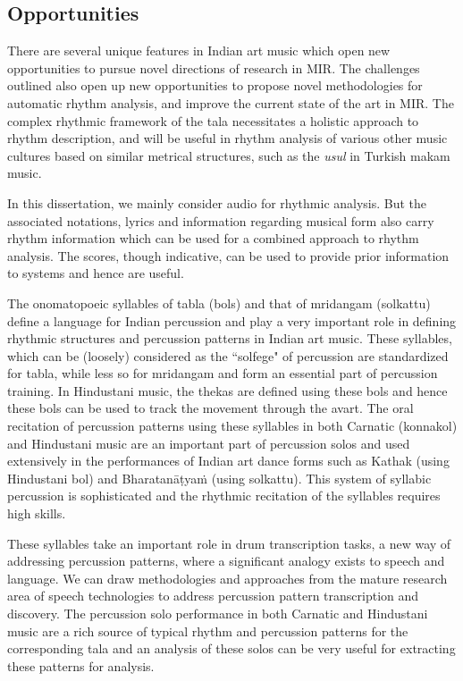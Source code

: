 \subsection{Opportunities}\label{sec:probdef:opportunities}
There are several unique features in Indian art music which open new opportunities to pursue novel directions of research in \gls{MIR}. The challenges outlined also open up new opportunities to propose novel methodologies for automatic rhythm analysis, and improve the current state of the art in \gls{MIR}. The complex rhythmic framework of the \gls{tala} necessitates a holistic approach to rhythm description, and will be useful in rhythm analysis of various other music cultures based on similar metrical structures, such as the \textit{usul} in Turkish makam music. 

In this dissertation, we mainly consider audio for rhythmic analysis. But the associated notations, lyrics and information regarding musical form also carry rhythm information which can be used for a combined approach to rhythm analysis. The scores, though indicative, can be used to provide prior information to systems and hence are useful. 

The onomatopoeic syllables of \gls{tabla} (\glspl{bol}) and that of mridangam (\gls{solkattu}) define a language for Indian percussion and play a very important role in defining rhythmic structures and percussion patterns in Indian art music. These syllables, which can be (loosely) considered as the ``solfege" of percussion are standardized for \gls{tabla}, while less so for mridangam and form an essential part of percussion training. In Hindustani music, the \glspl{theka} are defined using these \glspl{bol} and hence these \glspl{bol} can be used to track the movement through the \gls{avart}. The oral recitation of percussion patterns using these syllables in both Carnatic (\gls{konnakol}) and Hindustani music are an important part of percussion solos and used extensively in the performances of Indian art dance forms such as Kathak (using Hindustani \gls{bol}) and Bharatanāṭyaṁ (using \gls{solkattu}). This system of syllabic percussion is sophisticated and the rhythmic recitation of the syllables requires high skills. 

These syllables take an important role in drum transcription tasks, a new way of addressing percussion patterns, where a significant analogy exists to speech and language. We can draw methodologies and approaches from the mature research area of speech technologies to address percussion pattern transcription and discovery. The percussion solo performance in both Carnatic and Hindustani music are a rich source of typical rhythm and percussion patterns for the corresponding \gls{tala} and an analysis of these solos can be very useful for extracting these patterns for analysis. 

